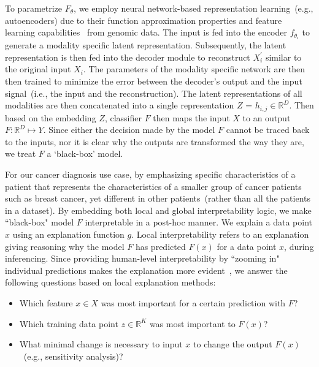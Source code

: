 \hspace*{3.5mm} To parametrize $F_{\theta}$, we employ neural network-based representation learning~(e.g., autoencoders) due to their function approximation properties and feature learning capabilities~\cite{xie2016unsupervised} from genomic data. The input is fed into the encoder $f_{\theta_{i}}$ to generate a modality specific latent representation. Subsequently, the latent representation is then fed into the decoder module to reconstruct ${X}_{i}^{\prime}$ similar to the original input $X_i$. The parameters of the modality specific network are then then trained to minimize the error between the decoder’s output and the input signal~(i.e., the input and the reconstruction). The latent representations of all modalities are then concatenated into a single representation $Z$ = $h_{i,j} \in \mathbb{R}^{D}$. Then based on the embedding $Z$, classifier $F$ then maps the input $X$ to an output $F: \mathbb{R}^{D} \mapsto Y$. Since either the decision made by the model $F$ cannot be traced back to the inputs, nor it is clear why the outputs are transformed the way they are, we treat $F$ a `black-box' model. 

\hspace*{3.5mm} For our cancer diagnosis use case, by emphasizing specific characteristics of a patient that represents the characteristics of a smaller group of cancer patients such as breast cancer, yet different in other patients~(rather than all the patients in a dataset). By embedding both local and global interpretability logic, we make ``black-box" model $F$ interpretable in a post-hoc manner. We explain a data point $x$ using an explanation function $g$. Local interpretability refers to an explanation giving reasoning why the model $F$ has predicted $F(x)$ for a data point $x$, during inferencing. Since providing human-level interpretability by ``zooming in" individual predictions makes the explanation more evident~\cite{ribeiro2018anchors}, we answer the following questions based on local explanation methods: 

\vspace{-2mm}
\begin{itemize}[noitemsep]
    \item Which feature $x \in X$ was most important for a certain prediction with $F$? 
    \item Which training data point $z \in \mathbb{R}^{K}$ was most important to $F(x)$? 
    \item What minimal change is necessary to input $x$ to change the output $F(x)$~(e.g., sensitivity analysis)? 
\end{itemize}
\vspace{-2mm}

